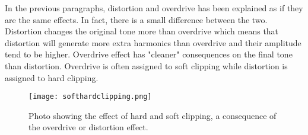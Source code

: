 In the previous paragraphs, distortion and overdrive has been explained as if they are the same effects. In fact, there is a small difference between the two. Distortion changes the original tone more than overdrive which means that distortion will generate more extra harmonics than overdrive and their amplitude tend to be higher. Overdrive effect has "cleaner" consequences on the final tone than distortion. Overdrive is often assigned to soft clipping while distortion is assigned to hard clipping.

\begin{figure} [htbp]
	\centering
  \texttt{[image: softhardclipping.png]}
  \caption{Photo showing the effect of hard and soft clipping, a consequence of the overdrive or distortion effect.}
  \label{fig:clipping2}
\end{figure}


